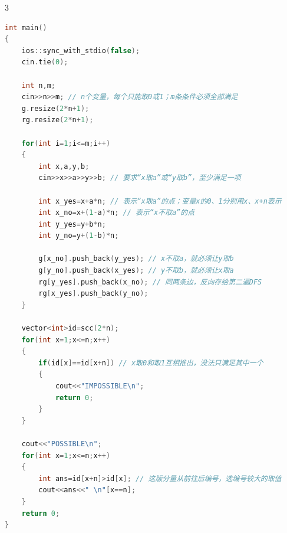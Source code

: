 \documentclass[10pt,landscape,a4paper]{article}
\begin{document}
\begin{multicols*}{3}
\begin{lstlisting}[language=C++]
int main()
{
    ios::sync_with_stdio(false);
    cin.tie(0);

    int n,m;
    cin>>n>>m; // n个变量，每个只能取0或1；m条条件必须全部满足
    g.resize(2*n+1);
    rg.resize(2*n+1);

    for(int i=1;i<=m;i++)
    {
        int x,a,y,b;
        cin>>x>>a>>y>>b; // 要求“x取a”或“y取b”，至少满足一项

        int x_yes=x+a*n; // 表示“x取a”的点；变量x的0、1分别用x、x+n表示
        int x_no=x+(1-a)*n; // 表示“x不取a”的点
        int y_yes=y+b*n;
        int y_no=y+(1-b)*n;

        g[x_no].push_back(y_yes); // x不取a，就必须让y取b
        g[y_no].push_back(x_yes); // y不取b，就必须让x取a
        rg[y_yes].push_back(x_no); // 同两条边，反向存给第二遍DFS
        rg[x_yes].push_back(y_no);
    }

    vector<int>id=scc(2*n);
    for(int x=1;x<=n;x++)
    {
        if(id[x]==id[x+n]) // x取0和取1互相推出，没法只满足其中一个
        {
            cout<<"IMPOSSIBLE\n";
            return 0;
        }
    }

    cout<<"POSSIBLE\n";
    for(int x=1;x<=n;x++)
    {
        int ans=id[x+n]>id[x]; // 这版分量从前往后编号，选编号较大的取值
        cout<<ans<<" \n"[x==n];
    }
    return 0;
}
\end{lstlisting}

\end{multicols*}
\end{document}
